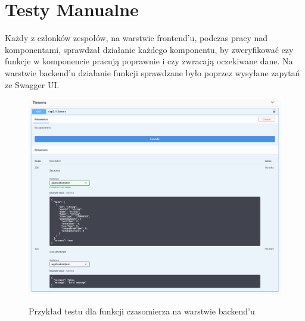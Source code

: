 \documentclass[a4paper,11pt]{report}
\begin{document}
\section{Testy Manualne}
Każdy z członków zespołów, na warstwie frontend'u, podczas pracy nad komponentami, sprawdzał działanie każdego komponentu,
 by zweryfikować czy funkcje w komponencie pracują poprawnie i czy zwracają oczekiwane dane.
Na warstwie backend'u działanie funkcji sprawdzane było poprzez wysyłane zapytań ze Swagger UI.
\begin{figure}[H]
	\centering
	\includegraphics[scale=0.35]{testy/timer_postman}\\
	\caption{Przykład testu dla funkcji czasomierza na warstwie backend'u}
	\label{fig:timer_postman}
\end{figure}
\end{document}
